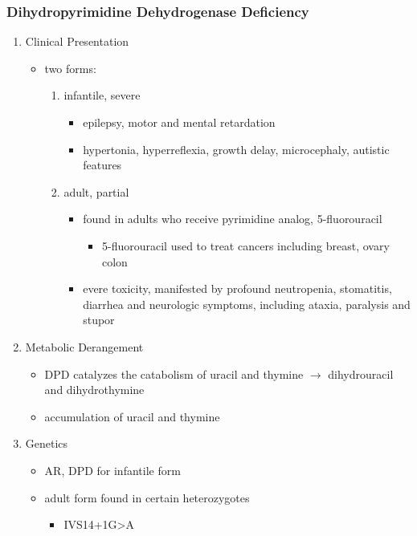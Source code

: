 \documentclass{scrartcl}
\begin{document}
\subsubsection{Dihydropyrimidine Dehydrogenase Deficiency}
\label{sec:org1c3b87a}
\begin{enumerate}
\item Clinical Presentation
\label{sec:org240ffb1}
\begin{itemize}
\item two forms:
\begin{enumerate}
\item infantile, severe
\begin{itemize}
\item epilepsy, motor and mental retardation
\item hypertonia, hyperreflexia, growth delay, microcephaly, autistic features
\end{itemize}
\item adult, partial
\begin{itemize}
\item found in adults who receive pyrimidine analog, 5-fluorouracil
\begin{itemize}
\item 5-fluorouracil used to treat cancers including breast, ovary colon
\end{itemize}
\item evere toxicity, manifested by profound neutropenia, stomatitis,
diarrhea and neurologic symptoms, including ataxia, paralysis
and stupor
\end{itemize}
\end{enumerate}
\end{itemize}

\item Metabolic Derangement
\label{sec:org5dc05d6}
\begin{itemize}
\item DPD catalyzes the catabolism of uracil and thymine \(\to\) dihydrouracil
and dihydrothymine
\item accumulation of uracil and thymine
\end{itemize}

\item Genetics
\label{sec:org7246eb2}
\begin{itemize}
\item AR, DPD for infantile form
\item adult form found in certain heterozygotes
\begin{itemize}
\item IVS14+1G>A
\end{itemize}
\end{itemize}


\end{enumerate}
\end{document}
